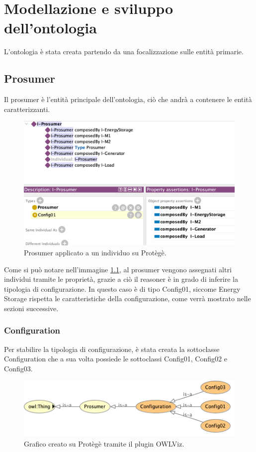 \chapter{Modellazione e sviluppo dell'ontologia}

L'ontologia è stata creata partendo da una focalizzazione sulle entità primarie.

\section{Prosumer}
Il prosumer è l'entità principale dell'ontologia, ciò che andrà a contenere le entità caratterizzanti.


\begin{figure}[!ht]
    \centering
    \includegraphics[width=12cm]{images/individual_prosumer.png}
    \caption{Prosumer applicato a un individuo su Protègè.}
    \label{fig:individual_prosumer}
\end{figure}

Come si può notare nell'immagine \ref*{fig:individual_prosumer}, al prosumer vengono assegnati altri individui tramite le proprietà, grazie a ciò il reasoner è in grado di inferire la tipologia di configurazione.
In questo caso è di tipo Config01, siccome Energy Storage rispetta le caratteristiche della configurazione, come verrà mostrato nelle sezioni successive.

\subsection{Configuration}
Per stabilire la tipologia di configurazione, è stata creata la sottoclasse Configuration che a sua volta possiede le sottoclassi Config01, Config02 e Config03.

\begin{figure}[!ht]
    \centering
    \includegraphics[width=12cm]{images/pros_graph.png}
    \caption{Grafico creato su Protègè tramite il plugin OWLViz.}
    \label{fig:pros_graph}
\end{figure}

